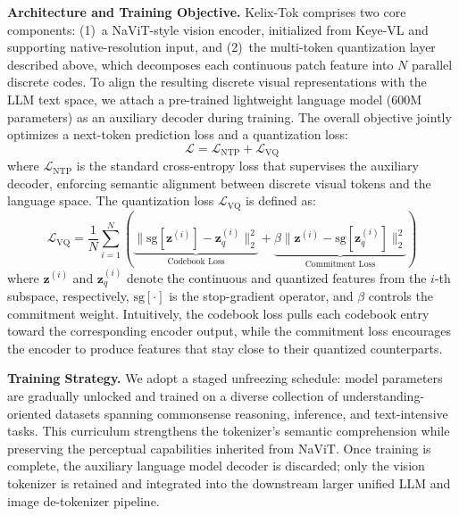 \documentclass[11pt, a4paper, logo, copyright]{googledeepmind}
\begin{document}
\textbf{Architecture and Training Objective.}
Kelix-Tok comprises two core components: (1)~a NaViT-style vision encoder, initialized from Keye-VL and supporting native-resolution input, and (2)~the multi-token quantization layer described above, which decomposes each continuous patch feature into $N$ parallel discrete codes.
%
To align the resulting discrete visual representations with the LLM text space, we attach a pre-trained lightweight language model (600M parameters) as an auxiliary decoder during training. The overall objective jointly optimizes a next-token prediction loss and a quantization loss:
%
\begin{equation}
\mathcal{L} = \mathcal{L}_{\text{NTP}} + \mathcal{L}_{\text{VQ}}
\end{equation}
%
where $\mathcal{L}_{\text{NTP}}$ is the standard cross-entropy loss that supervises the auxiliary decoder, enforcing semantic alignment between discrete visual tokens and the language space. The quantization loss $\mathcal{L}_{\text{VQ}}$ is defined as:
%
\begin{equation}
\mathcal{L}_{\text{VQ}} = \dfrac{1}{N}\sum_{i=1}^{N} \left( \underbrace{\big\| \text{sg}[\mathbf{z}^{\left(i\right)}] - \mathbf{z}_q^{\left(i\right)} \big\|_2^2}_{\text{Codebook Loss}} + \underbrace{\beta \big\| \mathbf{z}^{\left(i\right)} - \text{sg}[\mathbf{z}_q^{\left(i\right)}] \big\|_2^2 }_{\text{Commitment Loss}}\right)
\end{equation}
%
where $\mathbf{z}^{(i)}$ and $\mathbf{z}_q^{(i)}$ denote the continuous and quantized features from the $i$-th subspace, respectively, $\text{sg}[\cdot]$ is the stop-gradient operator, and $\beta$ controls the commitment weight. Intuitively, the codebook loss pulls each codebook entry toward the corresponding encoder output, while the commitment loss encourages the encoder to produce features that stay close to their quantized counterparts.

\textbf{Training Strategy.}
We adopt a staged unfreezing schedule: model parameters are gradually unlocked and trained on a diverse collection of understanding-oriented datasets spanning commonsense reasoning, inference, and text-intensive tasks. This curriculum strengthens the tokenizer's semantic comprehension while preserving the perceptual capabilities inherited from NaViT. Once training is complete, the auxiliary language model decoder is discarded; only the vision tokenizer is retained and integrated into the downstream larger unified LLM and image de-tokenizer pipeline.
\end{document}
